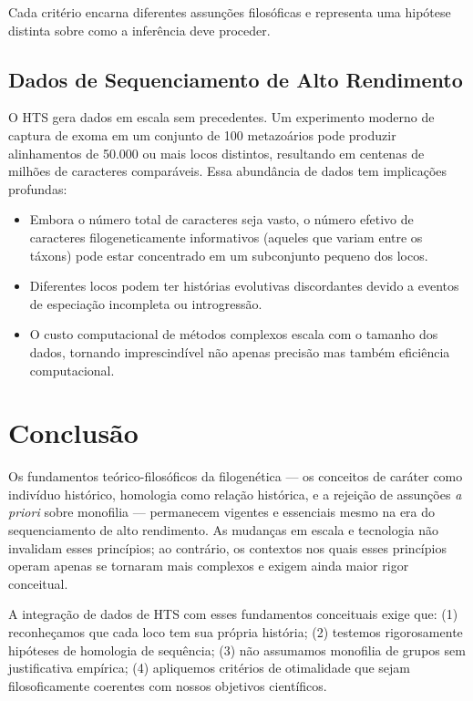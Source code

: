 Cada critério encarna diferentes assunções filosóficas e representa uma hipótese distinta sobre como a inferência deve proceder.

\subsection{Dados de Sequenciamento de Alto Rendimento}

O HTS gera dados em escala sem precedentes. Um experimento moderno de captura de exoma em um conjunto de 100 metazoários pode produzir alinhamentos de 50.000 ou mais locos distintos, resultando em centenas de milhões de caracteres comparáveis. Essa abundância de dados tem implicações profundas:

\begin{itemize}
    \item Embora o número total de caracteres seja vasto, o número efetivo de caracteres filogeneticamente informativos (aqueles que variam entre os táxons) pode estar concentrado em um subconjunto pequeno dos locos.
    \item Diferentes locos podem ter histórias evolutivas discordantes devido a eventos de especiação incompleta ou introgressão.
    \item O custo computacional de métodos complexos escala com o tamanho dos dados, tornando imprescindível não apenas precisão mas também eficiência computacional.
\end{itemize}

\section{Conclusão}

Os fundamentos teórico-filosóficos da filogenética --- os conceitos de caráter como indivíduo histórico, homologia como relação histórica, e a rejeição de assunções \textit{a priori} sobre monofilia --- permanecem vigentes e essenciais mesmo na era do sequenciamento de alto rendimento. As mudanças em escala e tecnologia não invalidam esses princípios; ao contrário, os contextos nos quais esses princípios operam apenas se tornaram mais complexos e exigem ainda maior rigor conceitual.

A integração de dados de HTS com esses fundamentos conceituais exige que: (1) reconheçamos que cada loco tem sua própria história; (2) testemos rigorosamente hipóteses de homologia de sequência; (3) não assumamos monofilia de grupos sem justificativa empírica; (4) apliquemos critérios de otimalidade que sejam filosoficamente coerentes com nossos objetivos científicos.

